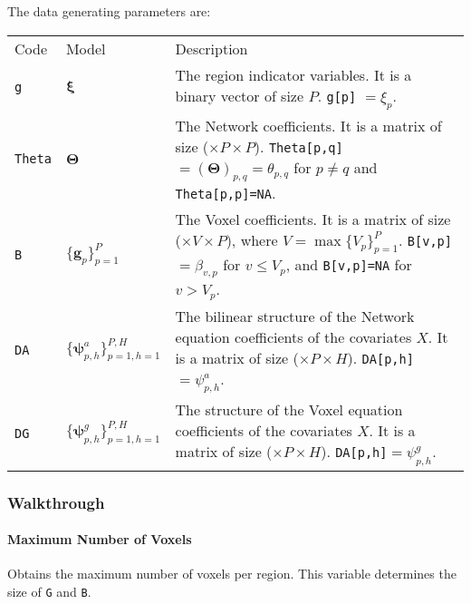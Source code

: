 \documentclass[
]{article}
\begin{document}
The data generating parameters are:

\begin{longtable}[]{@{}
  >{\raggedleft\arraybackslash}p{}
  >{\centering\arraybackslash}p{}
  >{\raggedright\arraybackslash}p{}@{}}
\toprule\noalign{}
\endhead
\bottomrule\noalign{}
\endlastfoot
Code & Model & Description \\
\texttt{g} & \( {\boldsymbol \xi} \) & The region indicator variables. It is a binary
vector of size \(P\). \texttt{g{[}p{]}} \(={\xi_p}\). \\
\texttt{Theta} & \( {\boldsymbol \Theta} \) & The Network coefficients. It is a matrix of size (\(\times P \times P\)).
\texttt{Theta{[}p,q{]}}\(=( {\boldsymbol \Theta} )_{p,q}=\theta_{p,q}\) for \(p\neq q\) and \texttt{Theta{[}p,p{]}=NA}. \\
\texttt{B} & \(\{ {\boldsymbol g} _p\}_{p=1}^P\) & The Voxel coefficients. It is a matrix of size (\(\times V \times P\)), where \(V=\max\{V_p\}_{p=1}^P\).
\texttt{B{[}v,p{]}}\(=\beta_{v,p}\) for \(v \leq V_p\), and \texttt{B{[}v,p{]}=NA} for \(v > V_p\). \\
\texttt{DA} & \(\{ {\boldsymbol \psi} _{p,h}^a\}_{p=1,h=1}^{P,H}\) & The bilinear structure of the Network equation coefficients of the covariates \(X\). It is a matrix of
size (\(\times P \times H\)). \texttt{DA{[}p,h{]}}\(= {\psi_{p,h}^{a}}\). \\
\texttt{DG} & \(\{ {\boldsymbol \psi} _{p,h}^g\}_{p=1,h=1}^{P,H}\) & The structure of the Voxel equation coefficients of the covariates \(X\). It is a matrix of size
(\(\times P \times H\)). \texttt{DA{[}p,h{]}}\(= {\psi_{p,h}^{g}}\). \\
\end{longtable}

\subsubsection{Walkthrough}\label{walkthrough-2}

\paragraph{Maximum Number of Voxels}\label{maximum-number-of-voxels}

Obtains the maximum number of voxels per region. This variable determines the
size of \texttt{G} and \texttt{B}.
\end{document}
